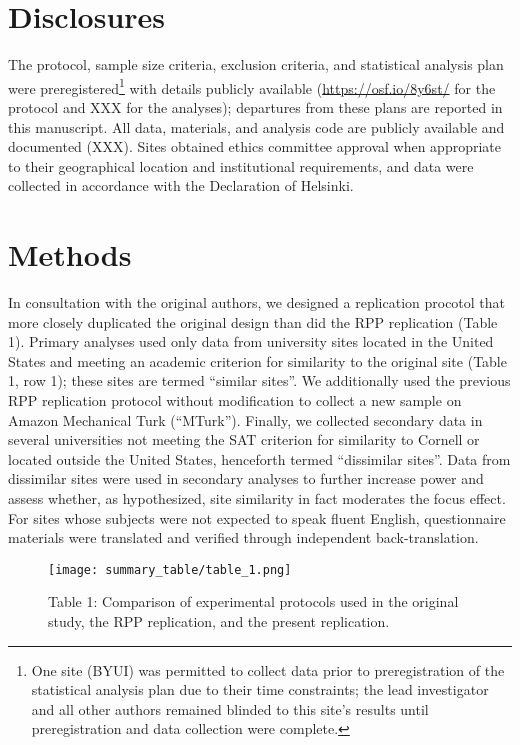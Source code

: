 \documentclass[english,floatsintext,man]{apa6}
\newcounter{author}
\theoremstyle{definition}
\theoremstyle{definition}
\theoremstyle{definition}
\theoremstyle{remark}
\begin{document}
\section{Disclosures}\label{disclosures}

The protocol, sample size criteria, exclusion criteria, and statistical
analysis plan were preregistered\footnote{One site (BYUI) was permitted
  to collect data prior to preregistration of the statistical analysis
  plan due to their time constraints; the lead investigator and all
  other authors remained blinded to this site's results until
  preregistration and data collection were complete.} with details
publicly available (\href{}{https://osf.io/8y6st/} for the protocol and
XXX for the analyses); departures from these plans are reported in this
manuscript. All data, materials, and analysis code are publicly
available and documented (XXX). Sites obtained ethics committee approval
when appropriate to their geographical location and institutional
requirements, and data were collected in accordance with the Declaration
of Helsinki.

\section{Methods}\label{methods}

In consultation with the original authors, we designed a replication
procotol that more closely duplicated the original design than did the
RPP replication (Table 1). Primary analyses used only data from
university sites located in the United States and meeting an academic
criterion for similarity to the original site (Table 1, row 1); these
sites are termed \enquote{similar sites}. We additionally used the
previous RPP replication protocol without modification to collect a new
sample on Amazon Mechanical Turk (\enquote{MTurk}). Finally, we
collected secondary data in several universities not meeting the SAT
criterion for similarity to Cornell or located outside the United
States, henceforth termed \enquote{dissimilar sites}. Data from
dissimilar sites were used in secondary analyses to further increase
power and assess whether, as hypothesized, site similarity in fact
moderates the focus effect. For sites whose subjects were not expected
to speak fluent English, questionnaire materials were translated and
verified through independent back-translation.

\begin{figure}
\centering
\texttt{[image: summary\_table/table\_1.png]}
\caption{Table 1: Comparison of experimental protocols used in the
original study, the RPP replication, and the present replication.}
\end{figure}
\end{document}
